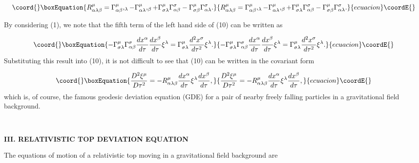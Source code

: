 \documentclass[a4paper,12pt]{article}
\begin{document}
\begin{equation}\coord{}\boxEquation{
R_{\alpha \lambda \beta }^{\mu }=\Gamma _{\alpha \beta }^{\mu },_{\lambda
}-\Gamma _{\alpha \lambda }^{\mu },_{\beta }+\Gamma _{\sigma \lambda }^{\mu
}\Gamma _{\alpha \beta }^{\sigma }-\Gamma _{\sigma \beta }^{\mu }\Gamma
_{\alpha \lambda }^{\sigma }.  \label{11}
}{
R_{\alpha \lambda \beta }^{\mu }=\Gamma _{\alpha \beta }^{\mu },_{\lambda
}-\Gamma _{\alpha \lambda }^{\mu },_{\beta }+\Gamma _{\sigma \lambda }^{\mu
}\Gamma _{\alpha \beta }^{\sigma }-\Gamma _{\sigma \beta }^{\mu }\Gamma
_{\alpha \lambda }^{\sigma }.  }{ecuacion}\coordE{}\end{equation}

By considering (1), we note that the fifth term of the left hand side of
(10) can be written as

\begin{equation}\coord{}\boxEquation{
-\Gamma _{\sigma \lambda }^{\mu }\Gamma _{\alpha \beta }^{\sigma }\frac{
dx^{\alpha }}{d\tau }\frac{dx^{\beta }}{d\tau }\xi ^{\lambda }=\Gamma
_{\sigma \lambda }^{\mu }\frac{d^{2}x^{\sigma }}{d\tau ^{2}}\xi ^{\lambda }.
\label{12}
}{
-\Gamma _{\sigma \lambda }^{\mu }\Gamma _{\alpha \beta }^{\sigma }\frac{
dx^{\alpha }}{d\tau }\frac{dx^{\beta }}{d\tau }\xi ^{\lambda }=\Gamma
_{\sigma \lambda }^{\mu }\frac{d^{2}x^{\sigma }}{d\tau ^{2}}\xi ^{\lambda }.
}{ecuacion}\coordE{}\end{equation}
Substituting this result into (10), it is not difficult to see that (10) can
be written in the covariant form

\begin{equation}\coord{}\boxEquation{
\frac{D^{2}\xi ^{\mu }}{D\tau ^{2}}=-R_{\alpha \lambda \beta }^{\mu }\frac{
dx^{\alpha }}{d\tau }\xi ^{\lambda }\frac{dx^{\beta }}{d\tau },  \label{13}
}{
\frac{D^{2}\xi ^{\mu }}{D\tau ^{2}}=-R_{\alpha \lambda \beta }^{\mu }\frac{
dx^{\alpha }}{d\tau }\xi ^{\lambda }\frac{dx^{\beta }}{d\tau },  }{ecuacion}\coordE{}\end{equation}
which is, of course, the famous geodesic deviation equation (GDE) for a pair
of nearby freely falling particles in a gravitational field background.


\bigskip\bigskip\bigskip\bigskip\ 

\noindent \textbf{III. RELATIVISTIC TOP DEVIATION EQUATION}

\bigskip

The equations of motion of a relativistic top moving in a gravitational
field background are
\end{document}
